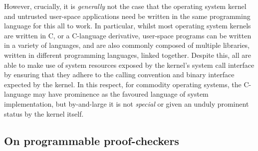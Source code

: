 \documentclass[a4paper, UKenglish, cleveref, autoref, thm-restate]{lipics-v2021}
\begin{document}
However, crucially, it is \emph{generally} not the case that the operating system kernel and untrusted user-space applications need be written in the same programming language for this all to work.
In particular, whilst most operating system kernels are written in C, or a C-language derivative, user-space programs can be written in a variety of languages, and are also commonly composed of multiple libraries, written in different programming languages, linked together.
Despite this, all are able to make use of system resources exposed by the kernel's system call interface by ensuring that they adhere to the calling convention and binary interface expected by the kernel.
In this respect, for commodity operating systems, the C-language may have prominence as the favoured language of system implementation, but by-and-large it is not \emph{special} or given an unduly prominent status by the kernel itself.

\subsection{On programmable proof-checkers}
\end{document}
